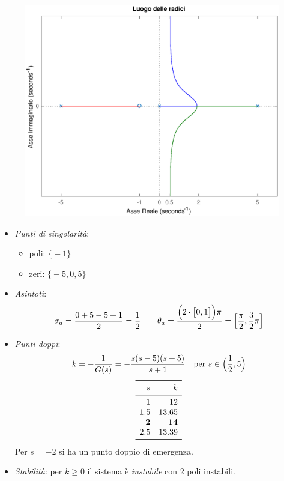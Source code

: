 \begin{figure}[ht]
	\centering
	\includegraphics[scale=.6]{mod1/assets/rl_ex310}
\end{figure}

\begin{itemize}
	\item \emph{Punti di singolarità}:
		\begin{itemize}
			\item poli: \(\bigl\{ -1 \bigr\}\)
			\item zeri: \(\bigl\{ -5,0,5 \bigr\}\)
		\end{itemize}
	\item \emph{Asintoti}:
		\[
			\sigma_a = \frac{0+5-5+1}{2} = \frac{1}{2} \qquad
			\theta_a = \frac{\Bigl(2\cdot \bigl[0,1\bigr]\Bigr)\pi}{2} = \Bigl[ \frac{\pi}{2},\frac{3}{2}\pi \Bigr]
		\]
	\item \emph{Punti doppi}:
		\[
			k = -\frac{1}{G(s)} = -\frac{s(s-5)(s+5)}{s+1} \quad
			\text{per } s \in \Bigl( \frac{1}{2},5 \Bigr)
		\]
		\[\begin{array}{rr}
			\toprule
			s 	&       k \\
			\midrule
			1 	&      12 \\
			1.5 	&   13.65 \\
			\bm{2} 	& \bm{14} \\
			2.5 	&   13.39 \\
			\bottomrule
		\end{array}\]
		Per \(s=-2\) si ha un punto doppio di emergenza.
	\item \emph{Stabilità}: per \(k \geq 0\) il sistema è \emph{instabile}
		con 2 poli instabili.
\end{itemize}


